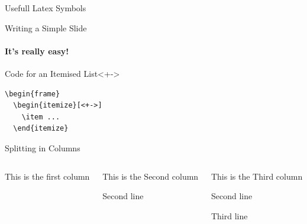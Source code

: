 \documentclass{beamer}
\begin{document}
\begin{frame}{Usefull Latex Symbols}
	{\faEmpire}{\faLanguage}{\faLaptop}{\faLeaf}{\faLineChart}{\faLocationArrow}
	{\faLock}{\faMap}{\faMapMarker}{\faMapO}{\faMehO}{\faMicrophone}
	{\faMicrophoneSlash}{\faSuitcase}{\faTag}{\faTags}{\faTerminal}
	{\faToggleOff}{\faToggleOn}{\faTrain}{\faTrash}{\faTrashO}{\faTree}
	{\faTrophy}{\faTruck}{\faTwitter}{\faTwitterSquare}{\faUmbrella}
	{\faUniversity}{\faUnlock}{\faUnlockAlt}{\faUser}{\faUserMd}{\faUserPlus}
	{\faUsers}{\faUserTimes}{\faEnvelope}{\faEnvelopeO}{\faExpeditedssl}
	{\faExternalLink}{\faExternalLinkSquare}{\faFastBackward}{\faFastForward}
	{\faPaperPlane}{\faPaperPlaneO}{\faVolumeDown}{\faVolumeOff}{\faVolumeUp}
	{\faWeibo}{\faWeixin}{\faWifi}{\faWikipediaW}{\faWindows}{\faWordpress}
	{\faYoutube}{\faYoutubePlay}{\faYoutubeSquare}{\faBank}{\faBarChartO}
	{\faFileZipO}{\faFlash}{\faInstitution}{\faMobilePhone}{\faMortarBoard}
	{\faPaste}{\faSend}{\faSendO}{\faWechat}
\end{frame}

\begin{frame}[fragile]{Writing a Simple Slide}
\framesubtitle{It's really easy!}
\begin{block}{Code for an Itemised List}<+->
\begin{verbatim}
\begin{frame}
  \begin{itemize}[<+->]
    \item ...
  \end{itemize}
\end{verbatim}
\end{block}
\end{frame}

\begin{frame}[fragile]{Splitting in Columns}
\begin{columns}
\begin{column}{0.3\textwidth}
	This is the first column\par
\end{column}
\begin{column}{0.4\textwidth}
	This is the Second column\par
	Second line\par
\end{column}
\begin{column}{0.3\textwidth}
	This is the Third column\par
	Second line\par
	Third line\par
\end{column}
\end{columns}
\end{frame}
\end{document}
